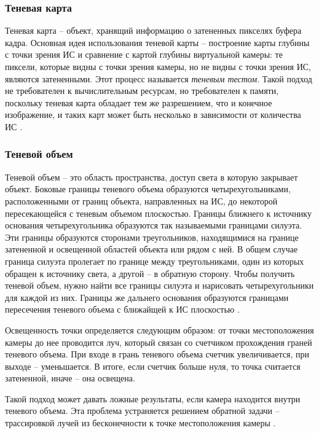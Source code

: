 \subsubsection*{Теневая карта}

Теневая карта -- объект, хранящий информацию о затененных пикселях буфера кадра. Основная идея использования теневой карты -- построение карты глубины с точки зрения ИС и сравнение с картой глубины виртуальной камеры: те пиксели, которые видны с точки зрения камеры, но не видны с точки зрения ИС, являются затененными. Этот процесс называется \textit{теневым тестом}. Такой подход не требователен к вычислительным ресурсам, но требователен к памяти, поскольку теневая карта обладает тем же разрешением, что и конечное изображение, и таких карт может быть несколько в зависимости от количества ИС \cite{engel2008programming}.

\subsubsection*{Теневой объем}

Теневой объем -- это область пространства, доступ света в которую закрывает объект. Боковые границы теневого объема образуются четырехугольниками, расположенными от границ объекта, направленных на ИС, до некоторой пересекающейся с теневым объемом плоскостью. Границы ближнего к источнику основания четырехугольника образуются так называемыми границами силуэта. Эти границы образуются сторонами треугольников, находящимися на границе затененной и освещенной областей объекта или рядом с ней. В общем случае граница силуэта пролегает по границе между треугольниками, один из которых обращен к источнику света, а другой -- в обратную сторону. Чтобы получить теневой объем, нужно найти все границы силуэта и нарисовать четырехугольники для каждой из них. Границы же дальнего основания образуются границами пересечения теневого объема с ближайщей к ИС плоскостью \cite{shad_vol}.

Освещенность точки определяется следующим образом: от точки местоположения камеры до нее проводится луч, который связан со счетчиком прохождения граней теневого объема. При входе в грань теневого объема счетчик увеличивается, при выходе -- уменьшается. В итоге, если счетчик больше нуля, то точка считается затененной, иначе -- она освещена.

Такой подход может давать ложные результаты, если камера находится внутри теневого объема. Эта проблема устраняется решением обратной задачи -- трассировкой лучей из бесконечности к точке местоположения камеры \cite{shad_vol}.

